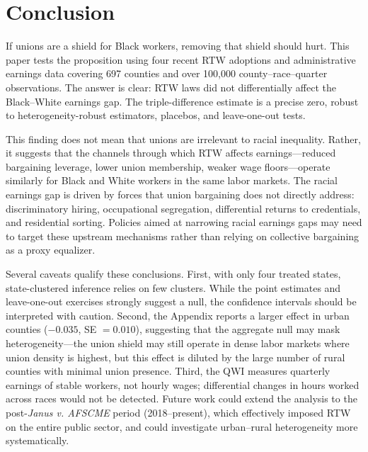 \documentclass[12pt]{article}
\begin{document}
\section{Conclusion}
\label{sec:conclusion}

If unions are a shield for Black workers, removing that shield should hurt. This paper tests the proposition using four recent RTW adoptions and administrative earnings data covering 697 counties and over 100,000 county--race--quarter observations. The answer is clear: RTW laws did not differentially affect the Black--White earnings gap. The triple-difference estimate is a precise zero, robust to heterogeneity-robust estimators, placebos, and leave-one-out tests.

This finding does not mean that unions are irrelevant to racial inequality. Rather, it suggests that the channels through which RTW affects earnings---reduced bargaining leverage, lower union membership, weaker wage floors---operate similarly for Black and White workers in the same labor markets. The racial earnings gap is driven by forces that union bargaining does not directly address: discriminatory hiring, occupational segregation, differential returns to credentials, and residential sorting. Policies aimed at narrowing racial earnings gaps may need to target these upstream mechanisms rather than relying on collective bargaining as a proxy equalizer.

Several caveats qualify these conclusions. First, with only four treated states, state-clustered inference relies on few clusters. While the point estimates and leave-one-out exercises strongly suggest a null, the confidence intervals should be interpreted with caution. Second, the Appendix reports a larger effect in urban counties ($-0.035$, SE $= 0.010$), suggesting that the aggregate null may mask heterogeneity---the union shield may still operate in dense labor markets where union density is highest, but this effect is diluted by the large number of rural counties with minimal union presence. Third, the QWI measures quarterly earnings of stable workers, not hourly wages; differential changes in hours worked across races would not be detected. Future work could extend the analysis to the post-\textit{Janus v. AFSCME} period (2018--present), which effectively imposed RTW on the entire public sector, and could investigate urban--rural heterogeneity more systematically.

\label{apep_main_text_end}

\newpage
\singlespacing

\end{document}
